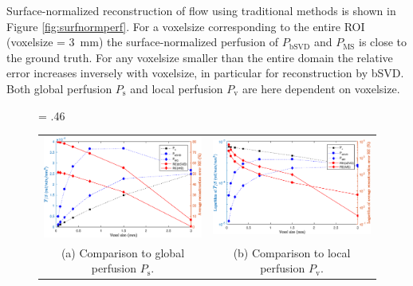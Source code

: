 \documentclass[final,5p,times,twocolumn]{elsarticle}
\begin{document}
Surface-normalized reconstruction of flow using traditional methods is shown in Figure \ref{fig:surfnormperf}. For a voxelsize corresponding to the entire ROI (voxelsize = \SI{3}{\milli\meter}) the surface-normalized perfusion of $P_{\mathrm{bSVD}}$ and $P_{\mathrm{MS}}$ is close to the ground truth. For any voxelsize smaller than the entire domain the relative error increases inversely with voxelsize, in particular for reconstruction by bSVD. Both global perfusion $P_{\mathrm{s}}$ and local perfusion $P_{\mathrm{v}}$ are here dependent on voxelsize.
    \begin{figure}[]
    	\centering
    	\fwd = .46\textwidth
    	\begin{tabular}{c c}
    		\includegraphics[width=\fwd]{figs/E110_CBFOnDifferentResolutions_plot-Ps-scaleto-S.eps} & \includegraphics[width=\fwd]{figs/E110_CBFOnDifferentResolutions_plot-Pv-scaleto-S.eps}\\	
    		(a) Comparison to global perfusion $P_{\mathrm{s}}$. & (b) Comparison to local perfusion $P_{\mathrm{v}}$.

\end{tabular}
\end{figure}
\end{document}

